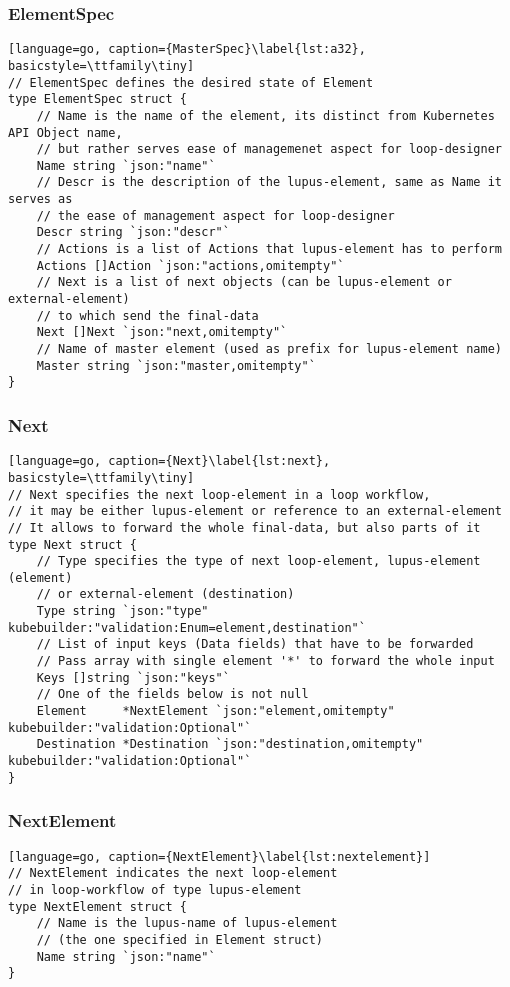 \subsubsection{ElementSpec}
\begin{lstlisting}[language=go, caption={MasterSpec}\label{lst:a32}, basicstyle=\ttfamily\tiny]
// ElementSpec defines the desired state of Element
type ElementSpec struct {
	// Name is the name of the element, its distinct from Kubernetes API Object name, 
    // but rather serves ease of managemenet aspect for loop-designer
	Name string `json:"name"`
	// Descr is the description of the lupus-element, same as Name it serves as 
    // the ease of management aspect for loop-designer
	Descr string `json:"descr"`
	// Actions is a list of Actions that lupus-element has to perform
	Actions []Action `json:"actions,omitempty"`
	// Next is a list of next objects (can be lupus-element or external-element) 
    // to which send the final-data
	Next []Next `json:"next,omitempty"`
	// Name of master element (used as prefix for lupus-element name)
	Master string `json:"master,omitempty"`
}
\end{lstlisting}

\subsubsection{Next}
\begin{lstlisting}[language=go, caption={Next}\label{lst:next}, basicstyle=\ttfamily\tiny]
// Next specifies the next loop-element in a loop workflow, 
// it may be either lupus-element or reference to an external-element
// It allows to forward the whole final-data, but also parts of it
type Next struct {
	// Type specifies the type of next loop-element, lupus-element (element) 
    // or external-element (destination)
	Type string `json:"type" kubebuilder:"validation:Enum=element,destination"`
	// List of input keys (Data fields) that have to be forwarded
	// Pass array with single element '*' to forward the whole input
	Keys []string `json:"keys"`
	// One of the fields below is not null
	Element     *NextElement `json:"element,omitempty" kubebuilder:"validation:Optional"`
	Destination *Destination `json:"destination,omitempty" kubebuilder:"validation:Optional"`
}
\end{lstlisting}

\subsubsection{NextElement}
\begin{lstlisting}[language=go, caption={NextElement}\label{lst:nextelement}]
// NextElement indicates the next loop-element 
// in loop-workflow of type lupus-element
type NextElement struct {
	// Name is the lupus-name of lupus-element 
	// (the one specified in Element struct)
	Name string `json:"name"`
}
\end{lstlisting}

